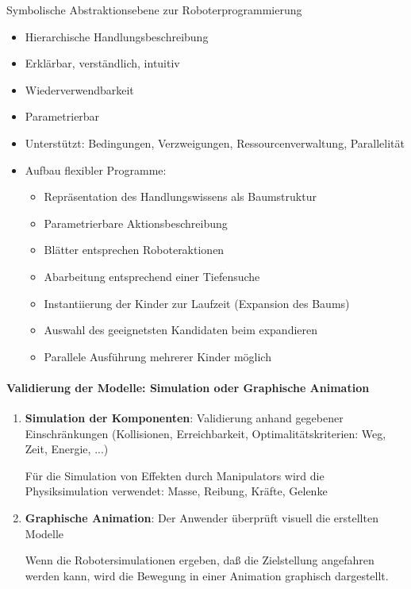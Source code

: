 Symbolische Abstraktionsebene zur Roboterprogrammierung
\begin{itemize}
\item Hierarchische Handlungsbeschreibung
\item Erklärbar, verständlich, intuitiv
\item Wiederverwendbarkeit
\item Parametrierbar
\item Unterstützt: Bedingungen, Verzweigungen, Ressourcenverwaltung, Parallelität
\item Aufbau flexibler Programme:
\begin{itemize}
\item Repräsentation des Handlungswissens als Baumstruktur
\item Parametrierbare Aktionsbeschreibung
\item Blätter entsprechen Roboteraktionen
\item Abarbeitung entsprechend einer Tiefensuche
\item Instantiierung der Kinder zur Laufzeit (Expansion des Baums)
\item Auswahl des geeignetsten Kandidaten beim expandieren
\item Parallele Ausführung mehrerer Kinder möglich
\end{itemize}
\end{itemize}
\paragraph*{Validierung der Modelle: Simulation oder Graphische Animation}
\begin{enumerate}
\item \textbf{Simulation der Komponenten}: Validierung anhand gegebener Einschränkungen (Kollisionen, Erreichbarkeit, Optimalitätskriterien: Weg, Zeit, Energie, ...)
\begin{itemize}
\ita Für die Simulation von Effekten durch Manipulators wird die Physiksimulation verwendet: Masse, Reibung, Kräfte, Gelenke
\end{itemize}
\item \textbf{Graphische Animation}: Der Anwender überprüft visuell die erstellten Modelle
\begin{itemize}
\ita Wenn die Robotersimulationen ergeben, daß die Zielstellung angefahren werden kann, wird die Bewegung in einer Animation graphisch dargestellt.
\end{itemize}
\end{enumerate}

